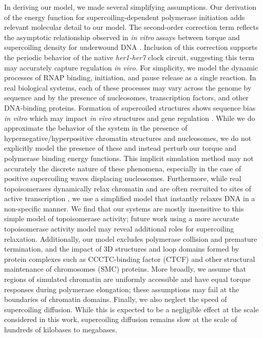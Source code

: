 \documentclass[11pt]{article}
\begin{document}
In deriving our model, we made several simplifying assumptions. Our derivation of the energy function for supercoiling-dependent polymerase initiation adds relevant molecular detail to our model. The second-order correction term reflects the asymptotic relationship observed in \textit{in vitro}  assays between torque and supercoiling density for underwound DNA \parencite{leSynergisticCoordinationChromatin2019}. Inclusion of this correction supports the periodic behavior of the native \emph{her1-her7} clock circuit, suggesting this term may accurately capture regulation \textit{in vivo}. For simplicity, we model the dynamic processes of RNAP binding, initiation, and pause release as a single reaction. In real biological systems, each of these processes may vary across the genome by sequence and by the presence of nucleosomes, transcription factors, and other DNA-binding proteins. Formation of supercoiled structures shows sequence bias \textit{in vitro} which may impact \textit{in vivo} structures and gene regulation \parencite{kimDNASequenceEncodes2018}.  While we do approximate the behavior of the system in the presence of hypernegative/hyperpositive chromatin structures and nucleosomes, we do not explicitly model the presence of these and instead perturb our torque and polymerase binding energy functions. This implicit simulation method may not accurately the discrete nature of these phenomena, especially in the case of positive supercoiling waves displacing nucleosomes. Furthermore, while real topoisomerases dynamically relax chromatin and are often recruited to sites of active transcription \parencite{baranelloRNAPolymeraseII2016}, we use a simplified model that instantly relaxes DNA in a non-specific manner. We find that our systems are mostly insensitive to this simple model of topoisomerase activity; future work using a more accurate topoisomerase activity model may reveal additional roles for supercoiling relaxation. Additionally, our model excludes polymerase collision and premature termination, and the impact of 3D structures and loop domains formed by protein complexes such as CCCTC-binding factor (CTCF) and other structural maintenance of chromosomes (SMC) proteins. More broadly, we assume that regions of simulated chromatin are uniformly accessible and have equal torque responses during polymerase elongation; these assumptions may fail at the boundaries of chromatin domains. Finally, we also neglect the speed of supercoiling diffusion. While this is expected to be a negligible effect at the scale considered in this work, supercoiling diffusion remains slow at the scale of hundreds of kilobases to megabases.
\end{document}
